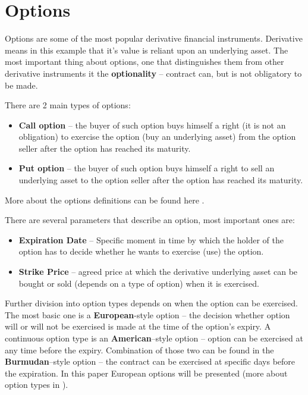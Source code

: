\section{Options}
    Options are some of the most popular derivative financial instruments. Derivative means in this example that it's value is reliant upon an underlying asset. The most important thing about options, one that distinguishes them from other derivative instruments it the \textbf{optionality} -- contract can, but is not obligatory to be made.
    
    There are 2 main types of options:
    \begin{itemize}
        \item \textbf{Call option} -- the buyer of such option buys himself a right (it is not an obligation) to exercise the option (buy an underlying asset) from the option seller after the option has reached its maturity.
        \item \textbf{Put option} -- the buyer of such option buys himself a right to sell an underlying asset to the option seller after the option has reached its maturity. 
    \end{itemize}
    \noindent
    More about the options definitions can be found here \cite{Call_Put_Option_Definition}.
    
    There are several parameters that describe an option, most important ones are:
    \begin{itemize}
        \item \textbf{Expiration Date} -- Specific moment in time by which the holder of the option has to decide whether he wants to exercise (use) the option.
        \item \textbf{Strike Price} -- agreed price at which the derivative underlying asset can be bought or sold (depends on a type of option) when it is exercised.
    \end{itemize}
    \noindent
    Further division into option types depends on when the option can be exercised. The most basic one is a \textbf{European}-style option -- the decision whether option will or will not be exercised is made at the time of the option's expiry. A continuous option type is an \textbf{American}--style option -- option can be exercised at any time before the expiry. Combination of those two can be found in the \textbf{Burmudan}--style option -- the contract can be exercised at specific days before the expiration. In this paper European options will be presented (more about option types in \cite{Option_Types}).
    
